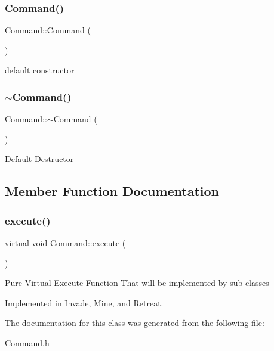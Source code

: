 \subsubsection{\texorpdfstring{Command()}{Command()}}
{\footnotesize\ttfamily Command\+::\+Command (\begin{DoxyParamCaption}{ }\end{DoxyParamCaption})\hspace{0.3cm}{\ttfamily [inline]}}

default constructor \mbox{\label{classCommand_ab552bb3a07fdd1acbfd8ea76e69b2278}} 
\subsubsection{\texorpdfstring{$\sim$\+Command()}{~Command()}}
{\footnotesize\ttfamily Command\+::$\sim$\+Command (\begin{DoxyParamCaption}{ }\end{DoxyParamCaption})\hspace{0.3cm}{\ttfamily [inline]}}

Default Destructor 

\subsection{Member Function Documentation}
\mbox{\label{classCommand_a6fd7d9bd8df8bfc881e4d6c7cd1878b7}} 
\subsubsection{\texorpdfstring{execute()}{execute()}}
{\footnotesize\ttfamily virtual void Command\+::execute (\begin{DoxyParamCaption}{ }\end{DoxyParamCaption})\hspace{0.3cm}{\ttfamily [pure virtual]}}

Pure Virtual Execute Function That will be implemented by sub classes 

Implemented in \hyperlink{classInvade_a111ebe8b6c5a3646b697ca906c815b35}{Invade}, \hyperlink{classMine_a2cfa55d098ec47369eed81226d82da25}{Mine}, and \hyperlink{classRetreat_a18fe7bf00ed623de02de5764b9607f5f}{Retreat}.



The documentation for this class was generated from the following file\+:\begin{DoxyCompactItemize}
\item 
Command.\+h\end{DoxyCompactItemize}
